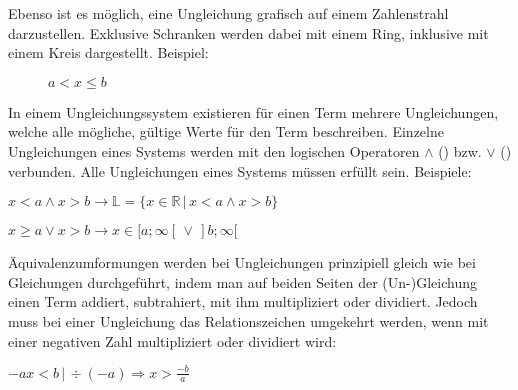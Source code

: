 \pagebreak


Ebenso ist es m\"{o}glich, eine Ungleichung grafisch auf einem Zahlenstrahl darzustellen. Exklusive Schranken werden dabei mit einem Ring, inklusive mit einem Kreis dargestellt. Beispiel:

\begin{figure}[h!]
	\caption*{$a < x \leq b$}
\end{figure}


In einem Ungleichungssystem existieren f\"{u}r einen Term mehrere Ungleichungen, welche alle m\"{o}gliche, g\"{u}ltige Werte f\"{u}r den Term beschreiben. Einzelne Ungleichungen eines Systems werden mit den logischen Operatoren $\land$ () bzw. $\lor$ () verbunden. Alle Ungleichungen eines Systems m\"{u}ssen erf\"{u}llt sein. Beispiele:

$x < a \land x > b \rightarrow \mathbb{L} = \{x \in \mathbb{R}\,|\,x < a \land x > b\}$

$x \geq a \lor x > b \rightarrow x \in [a;\infty[\, \lor \,]b;\infty[$


\"{A}quivalenzumformungen werden bei Ungleichungen prinzipiell gleich wie bei Gleichungen durchgef\"{u}hrt, indem man auf beiden Seiten der (Un-)Gleichung einen Term addiert, subtrahiert, mit ihm multipliziert oder dividiert. Jedoch muss bei einer Ungleichung das Relationszeichen umgekehrt werden, wenn mit einer negativen Zahl multipliziert oder dividiert wird:

$-ax < b \,|\, \div (-a) \Rightarrow x > \frac{-b}{a}$

